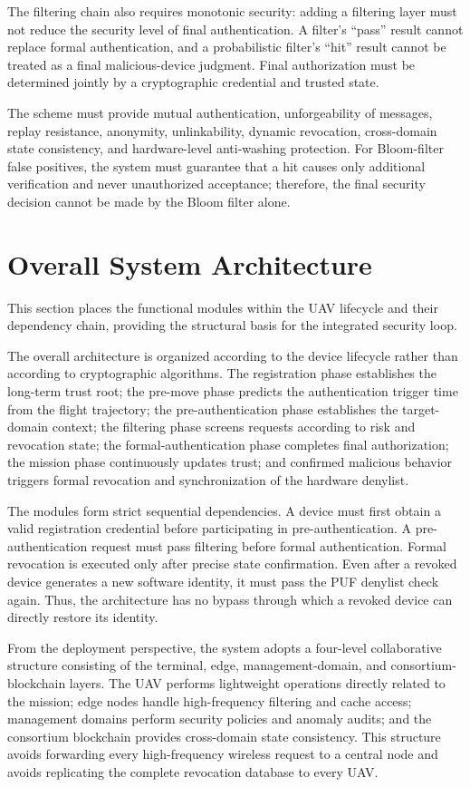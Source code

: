 \documentclass[lettersize,journal]{IEEEtran}
\begin{document}
	The filtering chain also requires monotonic security: adding a filtering layer must not reduce the security level of final authentication. A filter's ``pass'' result cannot replace formal authentication, and a probabilistic filter's ``hit'' result cannot be treated as a final malicious-device judgment. Final authorization must be determined jointly by a cryptographic credential and trusted state.
	
	The scheme must provide mutual authentication, unforgeability of messages, replay resistance, anonymity, unlinkability, dynamic revocation, cross-domain state consistency, and hardware-level anti-washing protection. For Bloom-filter false positives, the system must guarantee that a hit causes only additional verification and never unauthorized acceptance; therefore, the final security decision cannot be made by the Bloom filter alone.
	
	\section{Overall System Architecture}
	This section places the functional modules within the UAV lifecycle and their dependency chain, providing the structural basis for the integrated security loop.
	
	
	The overall architecture is organized according to the device lifecycle rather than according to cryptographic algorithms. The registration phase establishes the long-term trust root; the pre-move phase predicts the authentication trigger time from the flight trajectory; the pre-authentication phase establishes the target-domain context; the filtering phase screens requests according to risk and revocation state; the formal-authentication phase completes final authorization; the mission phase continuously updates trust; and confirmed malicious behavior triggers formal revocation and synchronization of the hardware denylist.
	
	The modules form strict sequential dependencies. A device must first obtain a valid registration credential before participating in pre-authentication. A pre-authentication request must pass filtering before formal authentication. Formal revocation is executed only after precise state confirmation. Even after a revoked device generates a new software identity, it must pass the PUF denylist check again. Thus, the architecture has no bypass through which a revoked device can directly restore its identity.
	
	From the deployment perspective, the system adopts a four-level collaborative structure consisting of the terminal, edge, management-domain, and consortium-blockchain layers. The UAV performs lightweight operations directly related to the mission; edge nodes handle high-frequency filtering and cache access; management domains perform security policies and anomaly audits; and the consortium blockchain provides cross-domain state consistency. This structure avoids forwarding every high-frequency wireless request to a central node and avoids replicating the complete revocation database to every UAV.
	
\end{document}
